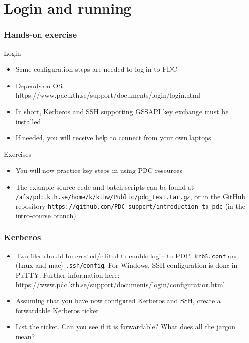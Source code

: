 \section*{Login and running}

\begin{frame}[fragile]
  \frametitle{Hands-on exercise}

\footnotesize
\begin{exampleblock}{\large{Login}}
\begin{itemize}
  \item Some configuration steps are needed to log in to PDC 
  \item Depends on OS: https://www.pdc.kth.se/support/documents/login/login.html
  \item In short, Kerberos and SSH supporting GSSAPI key exchange must be installed 
  \item If needed, you will receive help to connect from your own laptops
\end{itemize}
\end{exampleblock}

\begin{exampleblock}{\large{Exercises}}
\begin{itemize}
  \item You will now practice key steps in using PDC resources
  \item The example source code and batch scripts can be found at \verb|/afs/pdc.kth.se/home/k/kthw/Public/pdc_test.tar.gz|,
    or in the GitHub repository \verb|https://github.com/PDC-support/introduction-to-pdc| (in the intro-course branch)
\end{itemize}
\end{exampleblock}

\end{frame}



\begin{frame}[fragile]
  \frametitle{Kerberos}
\begin{itemize}
  \item Two files should be created/edited to enable login to PDC, \verb|krb5.conf| and (linux and mac) \verb|.ssh/config|.
    For Windows, SSH configuration is done in PuTTY. 
    Further information here: https://www.pdc.kth.se/support/documents/login/configuration.html

  \item Assuming that you have now configured Kerberos and SSH, create a forwardable Kerberos ticket
  \item List the ticket. Can you see if it is forwardable? What does all the jargon mean?

\end{itemize}
\end{frame}

